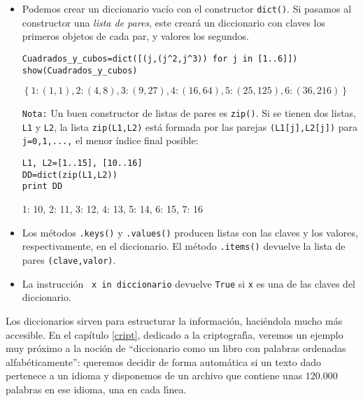 \begin{itemize}
\item Podemos crear un diccionario vacío con el constructor \lstinline|dict()|.
Si
pasamos al constructor una \emph{lista de pares}, este creará un diccionario con
claves
los primeros
objetos de cada par, y valores los segundos.

\begin{lstlisting}
Cuadrados_y_cubos=dict([(j,(j^2,j^3)) for j in [1..6]])
show(Cuadrados_y_cubos)
\end{lstlisting}
\begin{Output}
$\left\{1 : \left(1, 1\right), 2 : \left(4, 8\right), 3 : \left(9,
	27\right), 4 : \left(16, 64\right), 5 : \left(25, 125\right), 6 :
	\left(36, 216\right)\right\}$
\end{Output}


{\tt Nota:} Un buen constructor de listas de pares es \lstinline|zip()|. Si se
tienen dos
listas, \lstinline|L1| y \lstinline|L2|, la lista \lstinline|zip(L1,L2)| está
formada
por las parejas \lstinline|(L1[j],L2[j])| para \lstinline|j=0,1,...,| el menor
índice
final posible:
\begin{lstlisting}
L1, L2=[1..15], [10..16]
DD=dict(zip(L1,L2))
print DD
\end{lstlisting}
\begin{Output}
  	{1: 10, 2: 11, 3: 12, 4: 13, 5: 14, 6: 15, 7: 16}
\end{Output}

\item Los métodos \lstinline|.keys()| y \lstinline|.values()|
producen listas con las claves y los valores, respectivamente, en el
diccionario.
El método \lstinline|.items()| devuelve la lista de pares
\lstinline|(clave,valor)|.

\item La instrucción \lstinline| x in diccionario| devuelve \lstinline|True| si
\lstinline|x| es una de las claves del diccionario. 


\end{itemize}


 


Los diccionarios sirven para {\sc estructurar la informaci\'on}, haci\'endola
mucho m\'as accesible.  En el cap\'itulo \ref{cript}, dedicado a la
criptograf\'{\i}a,  veremos un ejemplo muy
pr\'oximo a la noci\'on de ``diccionario como un libro con palabras ordenadas
alfab\'eticamente'': queremos decidir de forma autom\'atica si un texto dado
pertenece a un idioma y disponemos de un archivo que contiene unas $120.000$
palabras en ese idioma,  una  en cada l\'{\i}nea. 

